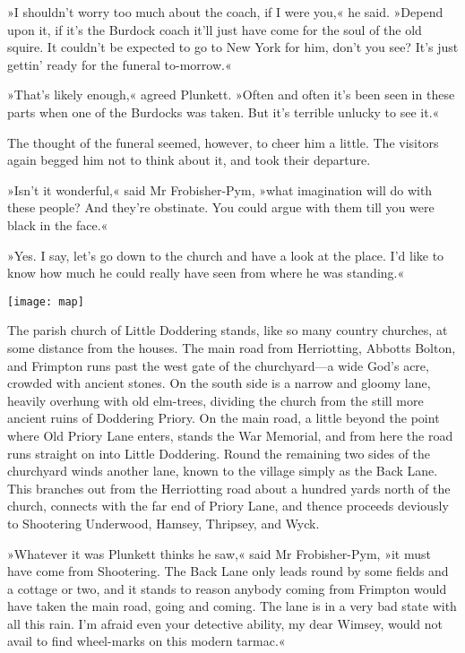»I shouldn't worry too much about the coach, if I were you,« he said. »Depend upon it, if it's the Burdock coach it'll just have come for the soul of the old squire. It couldn't be expected to go to New York for him, don't you see? It's just gettin' ready for the funeral to-morrow.«

»That's likely enough,« agreed Plunkett. »Often and often it's been seen in these parts when one of the Burdocks was taken. But it's terrible unlucky to see it.«

The thought of the funeral seemed, however, to cheer him a little. The visitors again begged him not to think about it, and took their departure.

»Isn't it wonderful,« said Mr Frobisher-Pym, »what imagination will do with these people? And they're obstinate. You could argue with them till you were black in the face.«

»Yes. I say, let's go down to the church and have a look at the place. I'd like to know how much he could really have seen from where he was standing.«

\begin{sidewaysfigure}
\texttt{[image: map]}%
\end{sidewaysfigure}


The parish church of Little Doddering stands, like so many country churches, at some distance from the houses. The main road from Herriotting, Abbotts Bolton, and Frimpton runs past the west gate of the churchyard—a wide God's acre, crowded with ancient stones. On the south side is a narrow and gloomy lane, heavily overhung with old elm-trees, dividing the church from the still more ancient ruins of Doddering Priory. On the main road, a little beyond the point where Old Priory Lane enters, stands the War Memorial, and from here the road runs straight on into Little Doddering. Round the remaining two sides of the churchyard winds another lane, known to the village simply as the Back Lane. This branches out from the Herriotting road about a hundred yards north of the church, connects with the far end of Priory Lane, and thence proceeds deviously to Shootering Underwood, Hamsey, Thripsey, and Wyck.

»Whatever it was Plunkett thinks he saw,« said Mr Frobisher-Pym, »it must have come from Shootering. The Back Lane only leads round by some fields and a cottage or two, and it stands to reason anybody coming from Frimpton would have taken the main road, going and coming. The lane is in a very bad state with all this rain. I'm afraid even your detective ability, my dear Wimsey, would not avail to find wheel-marks on this modern tarmac.«

